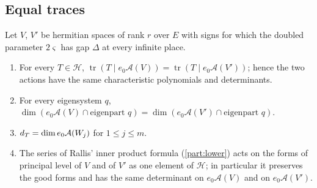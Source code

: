 \subsection{Equal traces}\label{ss:equal-traces}

\begin{theorem}\label{thm:equal-multiplicities}
Let $V$, $V'$ be hermitian spaces of rank $r$ over $E$ with signs for which the doubled parameter $2\varsigma$ has gap $\Delta$ at every infinite place.
\begin{enumerate}[label=\textup{(\alph*)}]
\item For every $T\in\mathcal H$, $\operatorname{tr}(T\mid e_0\mathcal A(V))=\operatorname{tr}(T\mid e_0\mathcal A(V'))$; hence the two actions have the same characteristic polynomials and
determinants.
\item For every eigensystem $q$, $\dim(e_0\mathcal A(V)\cap\text{eigenpart }q)=\dim(e_0\mathcal A(V')\cap\text{eigenpart }q)$.
\item $d_T=\dim e_0\mathcal A(W_j)$ for $1\le j\le m$.
\item The series of Rallis' inner product formula (\cref{part:lower}) acts on the forms of principal level of $V$ and of $V'$ as one element of $\mathcal H$; in particular it
preserves the good forms and has the same determinant on $e_0\mathcal A(V)$ and on $e_0\mathcal A(V')$.
\end{enumerate}
\end{theorem}

